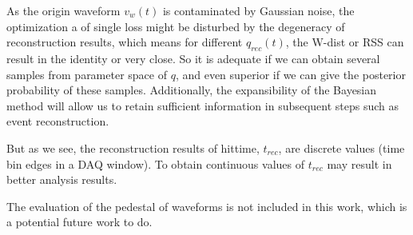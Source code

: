 
As the origin waveform $v_{w}(t)$ is contaminated by Gaussian noise, the optimization a of single loss might be disturbed by the degeneracy of reconstruction results, which means for different $q_{rec}(t)$, the W-dist or RSS can result in the identity or very close. So it is adequate if we can obtain several samples from parameter space of $q$, and even superior if we can give the posterior probability of these samples. Additionally, the expansibility of the Bayesian method will allow us to retain sufficient information in subsequent steps such as event reconstruction. 


But as we see, the reconstruction results of hittime, $t_{rec}$, are discrete values (time bin edges in a DAQ window). To obtain continuous values of $t_{rec}$ may result in better analysis results. 


The evaluation of the pedestal of waveforms is not included in this work, which is a potential future work to do. 

